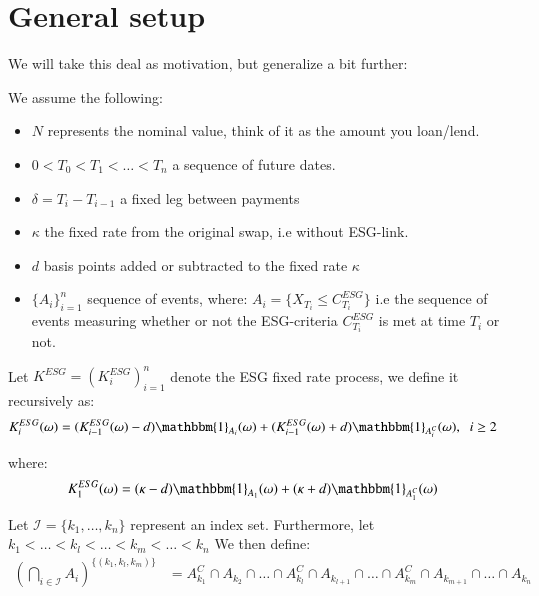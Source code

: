 \section{General setup}
We will take this deal as motivation, but generalize a bit further:
\begin{assumption}
We assume the following: 
\begin{itemize}[leftmargin=*]
    \item $N$ represents the nominal value, think of it as the amount you loan/lend.
    \item $0 < T_{0} < T_{1} < \dots < T_{n}$ a sequence of future dates. 
    \item $\delta = T_{i} - T_{i-1}$ a fixed leg between payments 
    \item $\kappa$ the fixed rate from the original swap, i.e without ESG-link. 
    \item $d$ basis points added or subtracted to the fixed rate $\kappa$
    \item $\{A_{i}\}_{i=1}^{n}$ sequence of events, where: 
    $A_{i} = \{X_{T_{i}} \leq C_{T_{i}}^{ESG}\}$ i.e the sequence of events measuring whether or not the ESG-criteria $C_{T_{i}}^{ESG}$ is met at time $T_{i}$ or not. 
\end{itemize}
\end{assumption} 


\begin{definition}
Let $K^{ESG} = (K_{i}^{ESG})_{i=1}^{n}$ 
denote the ESG fixed rate process, we define it recursively as: 
\begin{align*}
K_{i}^{ESG}(\omega) &= (K_{i-1}^{ESG}(\omega)-d)\mathbbm{1}_{A_{i}}(\omega)
+ (K_{i-1}^{ESG}(\omega)+d)\mathbbm{1}_{A_{i}^{C}}(\omega), \;\; i\geq 2
\end{align*}

where:
\begin{align*}
K_{1}^{ESG}(\omega) &= (\kappa - d)\mathbbm{1}_{A_{1}}(\omega)
+ (\kappa + d)\mathbbm{1}_{A_{1}^{C}}(\omega)    
\end{align*}
\end{definition} 

\begin{notation}
Let $\mathcal{I} = \{k_{1}, \dots, k_{n}\}$ represent an index set. Furthermore, let\\ 
$k_{1}< \dots < k_{l} < \dots < k_{m}< \dots < k_{n}$ We then define:
\begin{align*}
\left(
\bigcap_{i\in \mathcal{I}}A_{i}
\right)^{
\{(k_{1}, k_{l}, k_{m})\}
}
&= 
A_{k_{1}}^{C}\cap A_{k_{2}} \cap \dots\cap A_{k_{l}}^{C}\cap
A_{k_{l+1}}\cap \dots \cap A_{k_{m}}^{C}\cap A_{k_{m+1}}\cap \dots \cap A_{k_{n}}
\end{align*}
\end{notation}

